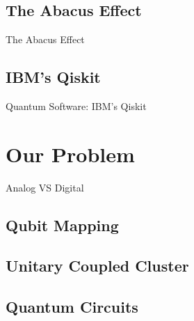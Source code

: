 \documentclass[9pt, handout, aspectratio=169]{beamer}		%
\begin{document}
	
	\subsection{The Abacus Effect}
	
	\begin{frame}{The Abacus Effect}
		
		
		
	\end{frame}
	

	\subsection{IBM's Qiskit}
		
	\begin{frame}{Quantum Software: IBM's Qiskit}
	
	
		
	\end{frame}
	

\section{Our Problem}
	
	\begin{frame}{Analog VS Digital}
		
				
		
	\end{frame}
	

	\subsection{Qubit Mapping}
	

	\subsection{Unitary Coupled Cluster}
	

	\subsection{Quantum Circuits}
	
\end{document}
